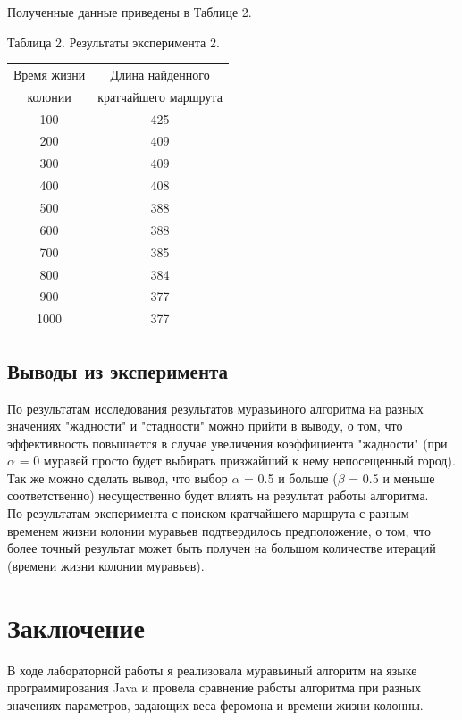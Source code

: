 \documentclass[a4paper,12pt]{article}
\begin{document}
Полученные данные приведены в Таблице 2.
{\flushright Таблица 2. Результаты эксперимента 2. \par}

\begin{center}
\begin{tabular}{|c|c|}
\hline
Время жизни & Длина найденного\\
колонии & кратчайшего маршрута\\
\hline
\hline
 100 & 425\\
 200 & 409\\
 300 & 409\\
 400 & 408\\ 
 500 & 388\\
 600 & 388\\
 700 & 385\\
 800 & 384\\
 900 & 377\\
1000 & 377\\
\hline
\end{tabular}
\end{center}

\subsection*{Выводы из эксперимента}

По результатам исследования результатов муравьиного алгоритма на разных значениях "жадности" и "стадности" можно прийти в выводу, о том, что эффективность повышается в случае увеличения коэффициента "жадности" (при $\alpha$ = 0 муравей просто будет выбирать призжайший к нему непосещенный город). Так же можно сделать вывод, что выбор $\alpha$ = 0.5 и больше ($\beta$ = 0.5 и меньше соответственно) несущественно будет влиять на результат работы алгоритма.\\
По результатам эксперимента с поиском кратчайшего маршрута с разным временем жизни колонии муравьев подтвердилось предположение, о том, что более точный результат может быть получен на большом количестве итераций (времени жизни колонии муравьев).

\section*{Заключение}

В ходе лабораторной работы я реализовала муравьиный алгоритм на языке программирования Java и провела сравнение работы алгоритма при разных значениях параметров, задающих веса феромона и времени жизни колонны.
\end{document}
